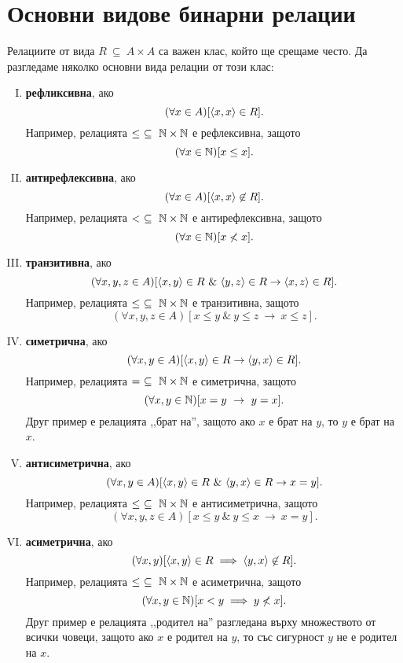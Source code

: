 \section{Основни видове бинарни релации}
Релациите от вида $R\ \subseteq\ A\times A$ са важен клас, който ще срещаме често.
Да разгледаме няколко основни вида релации от този клас:
\begin{enumerate}[I)]
\item
  {\bf рефликсивна}, ако
  \[(\forall x\in A)[\langle{x,x}\rangle\in R].\]
  Например, релацията $\leq\ \subseteq\ \Nat\times\Nat$ е рефлексивна, защото
  \[(\forall x\in \mathbb{N})[x \leq x].\]
\item
  {\bf антирефлексивна}, ако
  \[(\forall x\in A)[\langle{x,x}\rangle\not\in R].\]
  Например, релацията $<\ \subseteq\ \Nat\times\Nat$ е антирефлексивна, защото
  \[(\forall x\in \mathbb{N})[x \not< x].\]
\item
  {\bf транзитивна}, ако
  \[(\forall x,y,z\in A)[\pair{x,y}\in R\ \&\ \pair{y,z}\in R \rightarrow \pair{x,z}\in R].\]
  Например, релацията $\leq\ \subseteq\ \Nat\times\Nat$ е транзитивна, защото
  \[(\forall x,y,z\in A)[x \leq y\ \&\ y \leq z\ \rightarrow\ x\leq z].\]
\item
  {\bf симетрична}, ако
  \[(\forall x,y\in A)[\langle{x,y}\rangle\in R \rightarrow \langle{y,x}\rangle\in R].\]
  Например, релацията $=\ \subseteq\ \mathbb{N}\times\mathbb{N}$ е симетрична, защото
  \[(\forall x,y\in \Nat)[x = y\ \rightarrow\ y = x].\]
  Друг пример е релацията ,,брат на'', защото
  ако $x$ е брат на $y$, то $y$ е брат на $x$.
\item
  {\bf антисиметрична}, ако
  \[(\forall x,y\in A)[\pair{x,y}\in R\ \&\ \pair{y,x}\in R \rightarrow x = y].\]
  Например, релацията $\leq\ \subseteq\ \Nat\times\Nat$ е антисиметрична, защото
  \[(\forall x,y,z\in A)[x \leq y\ \&\ y \leq x\ \rightarrow\ x = y].\]
\item
  {\bf асиметрична}, ако
  \[(\forall x,y)[\langle{x,y}\rangle\in R \implies \langle{y,x}\rangle\not\in R].\]
  Например, релацията $\leq\ \subseteq\ \Nat\times\Nat$ е асиметрична, защото
  \[(\forall x,y\in \mathbb{N})[x < y \implies y \not< x].\]
  Друг пример е релацията ,,родител на'' разгледана върху множеството от всички човеци, защото
  ако $x$ е родител на $y$, то със сигурност $y$ не е родител на $x$.
\end{enumerate}

